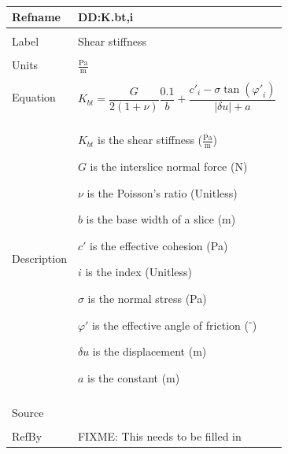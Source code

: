 \documentclass[12pt]{article}
\begin{document}
~\newline
\noindent \begin{minipage}{\textwidth}
\begin{tabular}{p{} p{}}
\toprule \textbf{Refname} & \textbf{DD:K.bt,i}
\label{DD:K.bt,i}
\\ \midrule \\
Label & Shear stiffness
\\ \midrule \\
Units & $\frac{\text{Pa}}{\text{m}}$
\\ \midrule \\
Equation & \begin{dmath}
           {K_{bt}}=\frac{G}{2 \left(1+ν\right)} \frac{0.1}{b}+\frac{{c'}_{i}-σ \tan\left({φ'}_{i}\right)}{|δu|+a}
           \end{dmath}
\\ \midrule \\
Description & \begin{symbDescription}
              \item{${K_{bt}}$ is the shear stiffness ($\frac{\text{Pa}}{\text{m}}$)}
              \item{$G$ is the interslice normal force (N)}
              \item{$ν$ is the Poisson's ratio (Unitless)}
              \item{$b$ is the base width of a slice (m)}
              \item{$c'$ is the effective cohesion (Pa)}
              \item{$i$ is the index (Unitless)}
              \item{$σ$ is the normal stress (Pa)}
              \item{$φ'$ is the effective angle of friction (${}^{\circ}$)}
              \item{$δu$ is the displacement (m)}
              \item{$a$ is the constant (m)}
              \end{symbDescription}
\\ \midrule \\
Source &
\\ \midrule \\
RefBy & FIXME: This needs to be filled in
\\ \bottomrule \end{tabular}
\end{minipage}\\
~\newline
\end{document}
